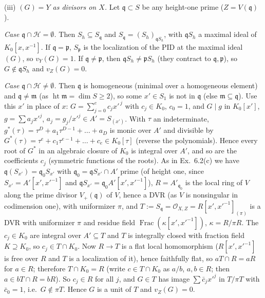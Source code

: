 \documentclass[11pt]{article}
\begin{document}
(iii) \emph{$(G)=Y$ as divisors on $X$.} Let $\mathfrak q\subset S$ be any height-one prime ($Z=V(\mathfrak q)$). 

\emph{Case $\mathfrak q\cap\mathcal H=\emptyset$.} Then $S_h\subseteq S_{\mathfrak q}$ and $S_{\mathfrak q}=(S_h)_{\mathfrak qS_h}$, with $\mathfrak qS_h$ a maximal ideal of $K_0[x,x^{-1}]$. If $\mathfrak q=\mathfrak p$, $S_{\mathfrak p}$ is the localization of the PID at the maximal ideal $(G)$, so $v_Y(G)=1$. If $\mathfrak q\ne\mathfrak p$, then $\mathfrak qS_h\neq\mathfrak pS_h$ (they contract to $\mathfrak q,\mathfrak p$), so $G\notin\mathfrak qS_h$ and $v_Z(G)=0$.

\emph{Case $\mathfrak q\cap\mathcal H\neq\emptyset$.} Then $\mathfrak q$ is homogeneous (minimal over a homogeneous element) and $\mathfrak q\ne\mathfrak m$ (as $\operatorname{ht}\mathfrak m=\dim S\ge2$), so some $x'\in S_1$ is not in $\mathfrak q$ (else $\mathfrak m\subseteq\mathfrak q$). Use this $x'$ in place of $x$: $G=\sum_{j=0}^ec_jx'^{\,j}$ with $c_j\in K_0$, $c_0=1$, and $G\mid g$ in $K_0[x']$, $g=\sum a_jx'^j$, $a_j=g_j/x'^j\in A'=S_{(x')}$. With $\tau$ an indeterminate, $g^*(\tau)=\tau^D+a_1\tau^{D-1}+\dots+a_D$ is monic over $A'$ and divisible by $G^*(\tau)=\tau^e+c_1\tau^{e-1}+\dots+c_e\in K_0[\tau]$ (reverse the polynomials). Hence every root of $G^*$ in an algebraic closure of $K_0$ is integral over $A'$, and so are the coefficients $c_j$ (symmetric functions of the roots). As in Ex.~6.2(c) we have $\mathfrak q(S_{x'})=\mathfrak q_0S_{x'}$ with $\mathfrak q_0=\mathfrak qS_{x'}\cap A'$ prime (of height one, since $S_{x'}=A'[x',x'^{-1}]$ and $\mathfrak qS_{x'}=\mathfrak q_0A'[x',x'^{-1}]$), $R=A'_{\mathfrak q_0}$ is the local ring of $V$ along the prime divisor $V_+(\mathfrak q)$ of $V$, hence a DVR (as $V$ is nonsingular in codimension one), with uniformizer $\pi$, and $T:=S_{\mathfrak q}=\mathcal O_{X,Z}=R[x',x'^{-1}]_{(\pi)}$ is a DVR with uniformizer $\pi$ and residue field $\operatorname{Frac}(\kappa[x',x'^{-1}])$, $\kappa=R/\pi R$. The $c_j\in K_0$ are integral over $A'\subseteq T$ and $T$ is integrally closed with fraction field $K\supseteq K_0$, so $c_j\in T\cap K_0$. Now $R\to T$ is a flat local homomorphism ($R[x',x'^{-1}]$ is free over $R$ and $T$ is a localization of it), hence faithfully flat, so $aT\cap R=aR$ for $a\in R$; therefore $T\cap K_0=R$ (write $c\in T\cap K_0$ as $a/b$, $a,b\in R$; then $a\in bT\cap R=bR$). So $c_j\in R$ for all $j$, and $G\in T$ has image $\sum\bar c_jx'^j$ in $T/\pi T$ with $\bar c_0=1$, i.e.\ $G\notin\pi T$. Hence $G$ is a unit of $T$ and $v_Z(G)=0$.
\end{document}
